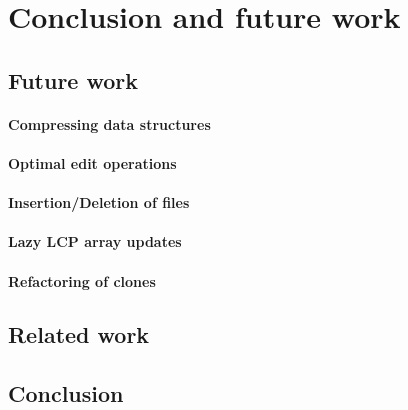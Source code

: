 \chapter{Conclusion and future work}

\section{Future work}

\subsubsection{Compressing data structures}

\subsubsection{Optimal edit operations}

\subsubsection{Insertion/Deletion of files}

\subsubsection{Lazy LCP array updates}

\subsubsection{Refactoring of clones}


\section{Related work}


\section{Conclusion}
